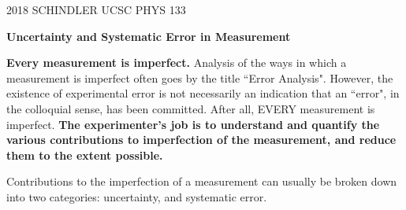 \documentclass[11pt]{article}
\begin{document}
\begin{flushright}
2018 SCHINDLER UCSC PHYS 133
\end{flushright}

\begin{center}
\noindent  \textbf{ \LARGE Uncertainty and Systematic Error in Measurement}
\end{center}

\textbf{Every measurement is imperfect.} Analysis of the ways in which a measurement is imperfect often goes by the title ``Error Analysis". However, the existence of experimental error is not necessarily an indication that an ``error", in the colloquial sense, has been committed. After all, EVERY measurement is imperfect. \textbf{The experimenter's job is to understand and quantify the various contributions to imperfection of the measurement, and reduce them to the extent possible.}

Contributions to the imperfection of a measurement can usually be broken down into two categories: uncertainty, and systematic error.
\end{document}
